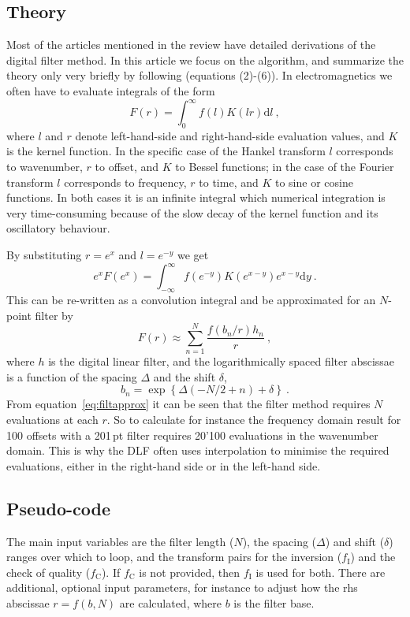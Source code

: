 \documentclass[paper,twocolumn,twoside]{geophysics}
\newcommand{\mr}[1]{\mathrm{#1}}
\begin{document}
\subsection{Theory}

Most of the articles mentioned in the review have detailed derivations of the
digital filter method. In this article we focus on the algorithm, and summarize
the theory only very briefly by following \cite{GEO.12.Key} (equations
(2)-(6)). In electromagnetics we often have to evaluate integrals of the form
%
\begin{equation}
  F(r) = \int^\infty_0 f(l)K(l r)\mr{d}l \ ,
  \label{eq:HankelInt}
\end{equation}
%
where $l$ and $r$ denote left-hand-side and right-hand-side evaluation values,
and $K$ is the kernel function. In the specific case of the Hankel transform
$l$ corresponds to wavenumber, $r$ to offset, and $K$ to Bessel functions; in
the case of the Fourier transform $l$ corresponds to frequency, $r$ to time,
and $K$ to sine or cosine functions. In both cases it is an infinite integral
which numerical integration is very time-consuming because of the slow decay
of the kernel function and its oscillatory behaviour.

By substituting $r = e^x$ and $l = e^{-y}$ we get
\begin{equation}
  e^x F(e^x) = \int^\infty_{-\infty} f(e^{-y})K(e^{x-y})e^{x-y}\mr{d}y\ .
  \label{eq:filtint}
\end{equation}
This can be re-written as a convolution integral and be approximated for an
$N$-point filter by
\begin{equation}
  F(r) \approx \sum^N_{n=1} \frac{f(b_n/r) h_n}{r}\ ,
  \label{eq:filtapprox}
\end{equation}
where $h$ is the digital linear filter, and the logarithmically spaced filter
abscissae is a function of the spacing $\Delta$ and the shift $\delta$,
\begin{equation}
  b_n = \exp\left\{\Delta(-N/2+n) + \delta\right\} \ .
  \label{eq:base}
\end{equation}
From equation~\ref{eq:filtapprox} it can be seen that the filter method
requires $N$ evaluations at each $r$. So to calculate for instance the
frequency domain result for 100 offsets with a 201\,pt filter requires 20'100
evaluations in the wavenumber domain. This is why the DLF often uses
interpolation to minimise the required evaluations, either in the right-hand
side or in the left-hand side.

\subsection{Pseudo-code}
The main input variables are the filter length ($N$), the spacing ($\Delta$)
and shift ($\delta$) ranges over which to loop, and the transform pairs for
the inversion ($f_\mr{I}$) and the check of quality ($f_\mr{C}$). If
$f_\mr{C}$ is not provided, then $f_\mr{I}$ is used for both. There are
additional, optional input parameters, for instance to adjust how the rhs
abscissae $r = f(b, N)$ are calculated, where $b$ is the filter base.
\end{document}
